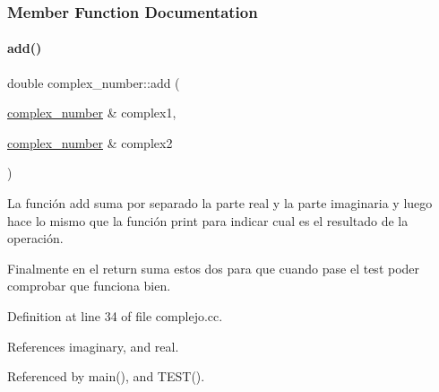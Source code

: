 \subsubsection{Member Function Documentation}
\mbox{\label{classcomplex__number_ad65b2d6465bb82ba98cc31937268d120}} 
\paragraph{\texorpdfstring{add()}{add()}}
{\footnotesize\ttfamily double complex\+\_\+number\+::add (\begin{DoxyParamCaption}\item[{\hyperlink{classcomplex__number}{complex\+\_\+number} \&}]{complex1,  }\item[{\hyperlink{classcomplex__number}{complex\+\_\+number} \&}]{complex2 }\end{DoxyParamCaption})}



La función add suma por separado la parte real y la parte imaginaria y luego hace lo mismo que la función print para indicar cual es el resultado de la operación. 

Finalmente en el return suma estos dos para que cuando pase el test poder comprobar que funciona bien. 

Definition at line 34 of file complejo.\+cc.



References imaginary, and real.



Referenced by main(), and T\+E\+S\+T().


